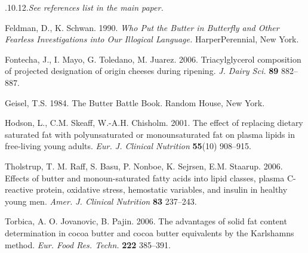 \documentclass[mnsc,blindrev]{informs3} %
\begin{document}
\begin{thebibliography}{}

{\fs.{10}.{12}.{\it See references list in the main paper.}}


Feldman, D., K. Schwan. 1990. {\it Who Put the Butter in Butterfly
and Other Fearless Investigations into Our Illogical Language.}
HarperPerennial, New York.

Fontecha, J., I. Mayo, G. Toledano, M. Juarez. 2006. 
Triacylglycerol composition  of projected designation
of origin cheeses during ripening. {\it J. Dairy Sci.} {\bf 89} 882--887.

Geisel, T.S. 1984. The Butter Battle Book.  Random House, New York.

Hodson, L., C.M. Skeaff, W.-A.H. Chisholm. 2001. The effect of
replacing dietary saturated fat with polyunsaturated or
monounsaturated fat on plasma lipids in free-living young adults.
{\it Eur. J. Clinical Nutrition} {\bf 55}(10) 908--915.

 Tholstrup, T. M. Raff, S. Basu, P. Nonboe, K. Sejrsen, E.M.
Staarup. 2006. Effects of butter and monoun-saturated fatty acids
into lipid classes, plasma C-reactive protein, oxidative stress,
hemostatic variables, and insulin in healthy young men. {\it Amer. J.
Clinical Nutrition} {\bf 83} 237--243.

Torbica, A. O. Jovanovic, B. Pajin. 2006. The advantages of solid
fat content determination in cocoa butter and cocoa butter
equivalents by the Karlshamns method. {\it Eur. Food Res. Techn.} {\bf 222}
385--391.

\end{thebibliography}

\end{document}

